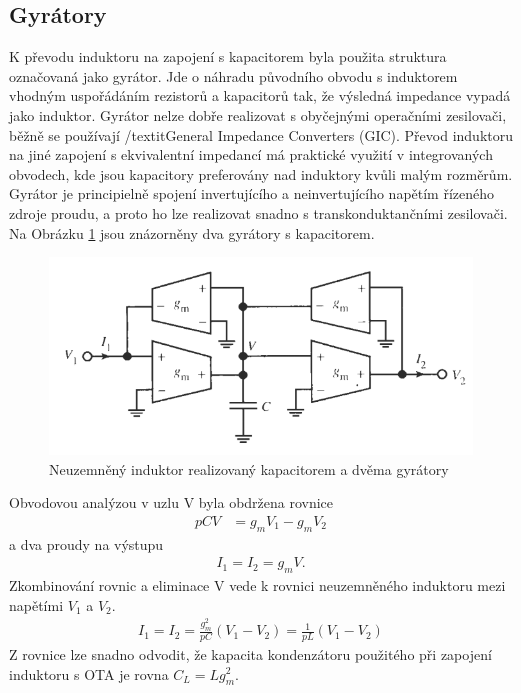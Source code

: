 \subsection{Gyrátory}\label{s:GYR}
\noindent K převodu induktoru na zapojení s kapacitorem byla použita struktura označovaná jako gyrátor. Jde o náhradu původního obvodu s induktorem vhodným uspořádáním rezistorů a kapacitorů tak, že výsledná impedance vypadá jako induktor. Gyrátor nelze dobře realizovat s obyčejnými operačními zesilovači, běžně se používají /textit{General Impedance Converters (GIC)}. Převod induktoru na jiné zapojení s ekvivalentní impedancí má praktické využití v integrovaných obvodech, kde jsou kapacitory preferovány nad induktory kvůli malým rozměrům. Gyrátor je principielně spojení invertujícího a neinvertujícího napětím řízeného zdroje proudu, a proto ho lze realizovat snadno s transkonduktančními zesilovači. Na Obrázku \ref{s:GO} jsou znázorněny dva gyrátory s kapacitorem. 
\begin{figure}[h]
\centering
\includegraphics[scale=0.6]{gyrator.png}
\caption{Neuzemněný induktor realizovaný kapacitorem a dvěma gyrátory \cite{12} \label{s:GO}}
\end{figure}
Obvodovou analýzou v uzlu V byla obdržena rovnice
\begin{align}
pCV &= g_mV_1 - g_mV_2
\end{align}
a dva proudy na výstupu
\begin{align}
I_1 = I_2 = g_mV.
\end{align}
Zkombinování rovnic a eliminace V vede k rovnici neuzemněného induktoru mezi napětími $V_1$ a $V_2$.
\begin{align}
I_1 = I_2 = \frac{g_m^2}{pC}(V_1 - V_2) = \frac{1}{pL}(V_1 - V_2)
\end{align}
Z rovnice lze snadno odvodit, že kapacita kondenzátoru použitého při zapojení induktoru s OTA je rovna $C_L = L g_m ^2$. \\
